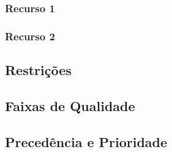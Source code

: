 


\subsubsection{Recurso 1}

\subsubsection{Recurso 2}

\subsection{Restrições}

\subsection{Faixas de Qualidade}

\subsection{Precedência e Prioridade}

